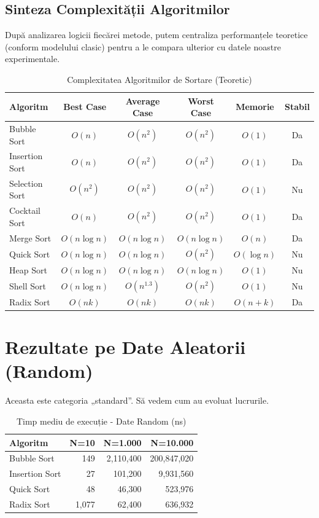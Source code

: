 \documentclass[12pt, a4paper]{article}
\begin{document}
\subsection{Sinteza Complexității Algoritmilor}
După analizarea logicii fiecărei metode, putem centraliza performanțele teoretice (conform modelului clasic) pentru a le compara ulterior cu datele noastre experimentale.

\begin{table}[H]
\centering
\small
\caption{Complexitatea Algoritmilor de Sortare (Teoretic)}
\begin{tabular}{lccccc}
\toprule
\textbf{Algoritm} & \textbf{Best Case} & \textbf{Average Case} & \textbf{Worst Case} & \textbf{Memorie} & \textbf{Stabil} \\
\midrule
Bubble Sort     & $O(n)$         & $O(n^2)$       & $O(n^2)$       & $O(1)$      & Da \\
Insertion Sort  & $O(n)$         & $O(n^2)$       & $O(n^2)$       & $O(1)$      & Da \\
Selection Sort  & $O(n^2)$       & $O(n^2)$       & $O(n^2)$       & $O(1)$      & Nu \\
Cocktail Sort   & $O(n)$         & $O(n^2)$       & $O(n^2)$       & $O(1)$      & Da \\
Merge Sort      & $O(n \log n)$  & $O(n \log n)$  & $O(n \log n)$  & $O(n)$      & Da \\
Quick Sort      & $O(n \log n)$  & $O(n \log n)$  & $O(n^2)$       & $O(\log n)$ & Nu \\
Heap Sort       & $O(n \log n)$  & $O(n \log n)$  & $O(n \log n)$  & $O(1)$      & Nu \\
Shell Sort      & $O(n \log n)$  & $O(n^{1.3})$   & $O(n^2)$       & $O(1)$      & Nu \\
Radix Sort      & $O(nk)$        & $O(nk)$        & $O(nk)$        & $O(n+k)$    & Da \\
\bottomrule
\end{tabular}
\end{table}

\section{Rezultate pe Date Aleatorii (Random)}
Aceasta este categoria „standard”. Să vedem cum au evoluat lucrurile.

\begin{table}[H]
\centering
\caption{Timp mediu de execuție - Date Random (ns)}
\begin{tabular}{lrrr}
\toprule
\textbf{Algoritm} & \textbf{N=10} & \textbf{N=1.000} & \textbf{N=10.000} \\
\midrule
Bubble Sort & 149 & 2,110,400 & 200,847,020 \\
Insertion Sort & 27 & 101,200 & 9,931,560 \\
Quick Sort & 48 & 46,300 & 523,976 \\
Radix Sort & 1,077 & 62,400 & 636,932 \\
\bottomrule
\end{tabular}
\end{table}
\end{document}
